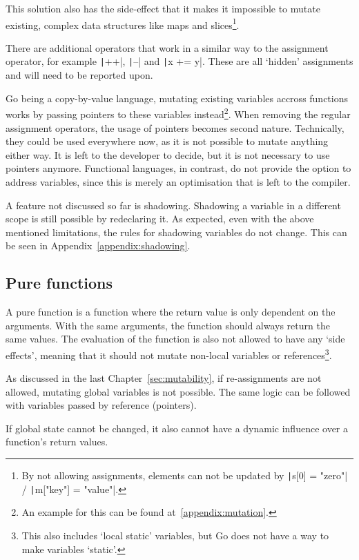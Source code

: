 This solution also has the side-effect that it makes it impossible to mutate
existing, complex data structures like maps and slices\footnote{By not
    allowing assignments, elements can not be updated by
\texttt|s[0] = "zero"| / \texttt|m["key"] = "value"|.}.

There are additional operators that work in a similar way to the assignment
operator, for example \texttt|++|, \texttt|--| and
\texttt|x += y|. These are all `hidden' assignments and will need to
be reported upon.

Go being a \gls{copy-by-value} language, mutating existing variables
    accross functions works by passing pointers to these variables instead\footnote{
        An example for this can be found at~\ref{appendix:mutation}.}.
When removing the regular assignment operators, the usage of pointers becomes
second nature. Technically, they could be used everywhere now, as it is not
possible to mutate anything either way. It is left to the developer to decide,
but it is not necessary to use pointers anymore. Functional languages, in contrast,
do not provide the option to address variables, since this is merely an optimisation
that is left to the compiler.

A feature not discussed so far is shadowing. Shadowing a variable in a different
scope is still possible by redeclaring it. As expected, even with the above
mentioned limitations, the rules for shadowing variables do not change. This
can be seen in Appendix~\ref{appendix:shadowing}.

\subsection{Pure functions}

A pure function is a function where the return value is only dependent on
the arguments. With the same arguments, the function should always return
the same values. The evaluation of the function is also not allowed to have
any `side effects', meaning that it should not mutate non-local variables or
references\footnote{This also includes `local static' variables, but Go does
not have a way to make variables `static'.}.

As discussed in the last Chapter~\ref{sec:mutability}, if re-assignments
are not allowed, mutating global variables is not possible. The same logic
can be followed with variables passed by reference (pointers).

If global state cannot be changed, it also cannot have a dynamic influence
over a function's return values.

